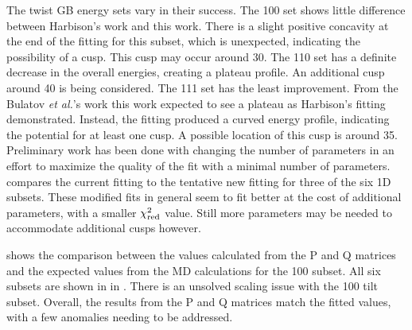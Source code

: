 \documentclass[twoside,senior]{BYUPhys}
\begin{document}
The twist GB energy sets vary in their success.  The \textlangle{}100\textrangle{} set shows little difference between Harbison's \cite{harbison2015} work and this work.  There is a slight positive concavity at the end of the fitting for this subset, which is unexpected, indicating the possibility of a cusp.  This cusp may occur around 30\textdegree{}.  The \textlangle{}110\textrangle{} set has a definite decrease in the overall energies, creating a plateau profile.  An additional cusp around 40\textdegree{} is being considered.  The \textlangle{}111\textrangle{} set has the least improvement.  From the Bulatov \emph{et al.}'s work\cite{bulatov2014} this work expected to see a plateau as Harbison's fitting demonstrated.\cite{harbison2015}  Instead, the fitting produced a curved energy profile, indicating the potential for at least one cusp.  A possible location of this cusp is around 35\textdegree{}.  Preliminary work has been done with changing the number of parameters in an effort to maximize the quality of the fit with a minimal number of parameters.  compares the current fitting to the tentative new fitting for three of the six 1D subsets.  These modified fits in general seem to fit better at the cost of additional parameters, with a smaller $\chi_{\textnormal{red}}^2$ value.  Still more parameters may be needed to accommodate additional cusps however.

 shows the comparison between the values calculated from the P and Q matrices and the expected values from the MD calculations for the \textlangle{}100\textrangle{} subset.  All six subsets are shown in  in .  There is an unsolved scaling issue with the \textlangle{}100\textrangle{} tilt subset.  Overall, the results from the P and Q matrices match the fitted values, with a few anomalies needing to be addressed.
\end{document}
